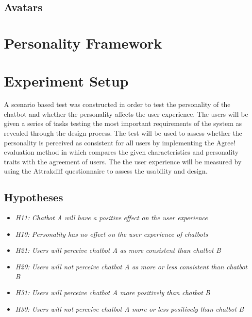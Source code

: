     \subsection{Avatars}
    
\vspace{5mm} %

\section{Personality Framework}

\vspace{5mm} %

\section{Experiment Setup}

A scenario based test was constructed in order to test the personality of the chatbot and whether the personality affects the user experience. The users will be given a series of tasks testing the most important requirements of the system as revealed through the design process. The test will be used to assess whether the personality is perceived as consistent for all users by implementing the Agree! evaluation method in which compares the given characteristics and personality traits with the agreement of users. The the user experience will be measured by using the Attrakdiff questionnaire to assess the usability and design. 

\vspace{5mm} %

    \subsection{Hypotheses}
 
    \begin{itemize}
         \item \textit {H11: Chatbot A will have a positive effect on the user experience}
        \item \textit {H10: Personality has no effect on the user experience of chatbots}
            \vspace{5mm} %

        \item \textit {H21: Users will perceive chatbot A as more consistent than chatbot B}
        \item  \textit {H20: Users will not perceive chatbot A as more or less consistent than chatbot B} 
            \vspace{5mm} %

        \item \textit {H31: Users will perceive chatbot A more positively than chatbot B}
        \item \textit {H30: Users will not perceive chatbot A more or less positively than chatbot B}
    \end{itemize}
    
